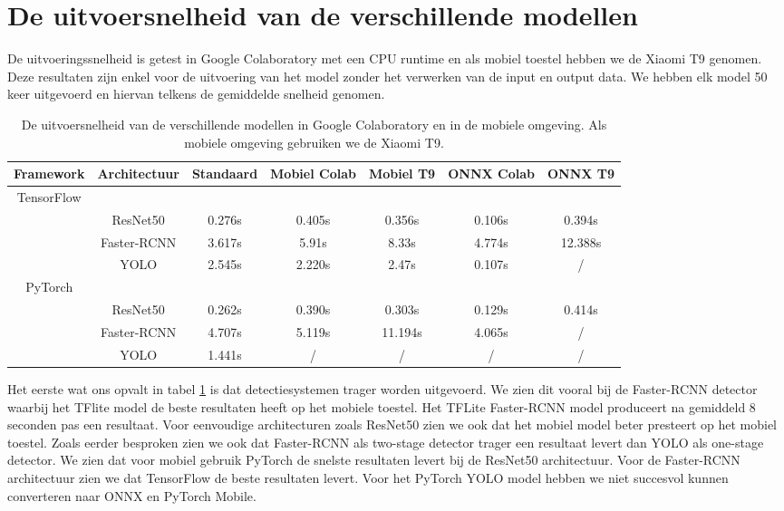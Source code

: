 \section{De uitvoersnelheid van de verschillende modellen}
De uitvoeringssnelheid is getest in Google Colaboratory met een CPU runtime en als mobiel toestel hebben we de Xiaomi T9 genomen.
Deze resultaten zijn enkel voor de uitvoering van het model zonder het verwerken van de input en output data.
We hebben elk model 50 keer uitgevoerd en hiervan telkens de gemiddelde snelheid genomen.

\begin{table}[!ht]
    \caption{De uitvoersnelheid van de verschillende modellen in Google Colaboratory en in de mobiele omgeving. Als mobiele omgeving gebruiken we de Xiaomi T9.}
\begin{tabular}{ccccccc}
    \hline
    Framework & Architectuur & Standaard & Mobiel Colab & Mobiel T9 & ONNX Colab & ONNX T9\\
    \hline
    TensorFlow & & & & \\
     & ResNet50 & 0.276s & 0.405s & 0.356s & 0.106s & 0.394s \\
     & Faster-RCNN & 3.617s & 5.91s & 8.33s & 4.774s & 12.388s \\
     & YOLO & 2.545s & 2.220s & 2.47s & 0.107s & / \\
    PyTorch & & & & \\
    & ResNet50 & 0.262s & 0.390s & 0.303s & 0.129s & 0.414s \\
    & Faster-RCNN & 4.707s & 5.119s & 11.194s & 4.065s & / \\
    & YOLO & 1.441s & / & / & / & / \\
    \hline
\end{tabular}
\label{tab:speed}
\end{table}

Het eerste wat ons opvalt in tabel \ref{tab:speed} is dat detectiesystemen trager worden uitgevoerd.
We zien dit vooral bij de Faster-RCNN detector waarbij het TFlite model de beste resultaten heeft op het mobiele toestel.
Het TFLite Faster-RCNN model produceert na gemiddeld 8 seconden pas een resultaat.
Voor eenvoudige architecturen zoals ResNet50 zien we ook dat het mobiel model beter presteert op het mobiel toestel.
Zoals eerder besproken zien we ook dat Faster-RCNN als two-stage detector trager een resultaat levert dan YOLO als one-stage detector.
We zien dat voor mobiel gebruik PyTorch de snelste resultaten levert bij de ResNet50 architectuur.
Voor de Faster-RCNN architectuur zien we dat TensorFlow de beste resultaten levert.
Voor het PyTorch YOLO model hebben we niet succesvol kunnen converteren naar ONNX en PyTorch Mobile.

